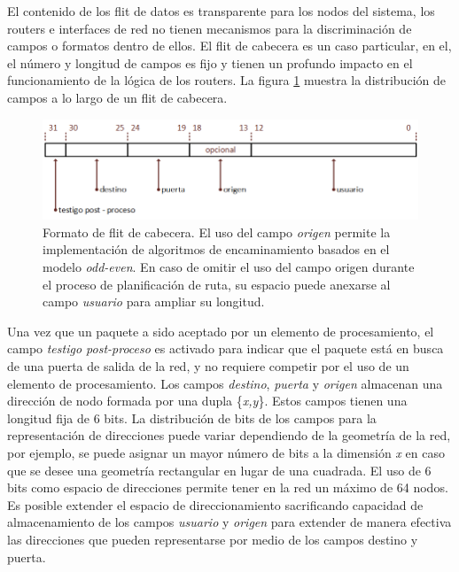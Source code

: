 El contenido de los flit de datos es transparente para los nodos del sistema, los routers e interfaces de red no tienen mecanismos para la discriminación de campos o formatos dentro de ellos. El flit de cabecera es un caso particular, en el, el número y longitud de campos es fijo y tienen un profundo impacto en el funcionamiento de la lógica de los routers. La figura \ref{fig:ch4_flit_cabecera} muestra la distribución de campos a lo largo de un flit de cabecera.

\begin{figure}
	\begin{center}
		\includegraphics[scale=0.7]{figures/ch4_flit_cabecera.png}
	\end{center}
	\caption
		{	
			Formato de flit de cabecera. El uso del campo \textit{origen} permite la implementación de algoritmos de encaminamiento basados en el modelo \textit{odd-even}. En caso de omitir el uso del campo origen durante el proceso de planificación de ruta, su espacio puede anexarse al campo \textit{usuario} para ampliar su longitud.
		}
	\label{fig:ch4_flit_cabecera}
\end{figure}

Una vez que un paquete a sido aceptado por un elemento de procesamiento, el campo \textit{testigo post-proceso} es activado para indicar que el paquete está en busca de una puerta de salida de la red, y no requiere competir por el uso de un elemento de procesamiento. Los campos \textit{destino}, \textit{puerta} y \textit{origen} almacenan una dirección de nodo formada por una dupla \{\textit{x,y}\}. Estos campos tienen una longitud fija de 6 bits. La distribución de bits de los campos para la representación de direcciones puede variar dependiendo de la geometría de la red, por ejemplo, se puede asignar un mayor número de bits a la dimensión \textit{x} en caso que se desee una geometría rectangular en lugar de una cuadrada. El uso de 6 bits como espacio de direcciones permite tener en la red un máximo de 64 nodos. Es posible extender el espacio de direccionamiento sacrificando capacidad de almacenamiento de los campos \textit{usuario} y \textit{origen} para extender de manera efectiva las direcciones que pueden representarse por medio de los campos destino y puerta.

